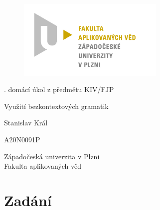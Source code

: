 \documentclass[12pt, a4paper]{article}
\let\oldsection\section
\renewcommand\section{\clearpage\oldsection}
\begin{document}
	\renewcommand{\lstlistingname}{Ukázka kódu}
	\renewcommand{\lstlistlistingname}{Seznam ukázek kódu}
    \begin{titlepage}

       \centering

       \vspace*{\baselineskip}

       \begin{figure}[H]
          \centering
          \includegraphics[width=7cm]{img/fav-logo.jpg}
       \end{figure}

       \vspace*{1\baselineskip}
        {. domácí úkol z předmětu KIV/FJP}
       \vspace*{1\baselineskip}

       \vspace{0.75\baselineskip}

       {\LARGE\sc Využití bezkontextových gramatik\\}

       \vspace{4\baselineskip}
       
		\vspace{0.5\baselineskip}

       
       {\sc\Large Stanislav Král \\}

       \vspace{0.5\baselineskip}

       {A20N0091P}

       \vfill

       {\sc Západočeská univerzita v Plzni\\
       Fakulta aplikovaných věd}


    \end{titlepage}


    \tableofcontents
    \pagebreak


    
    \section{Zadání}
\end{document}

